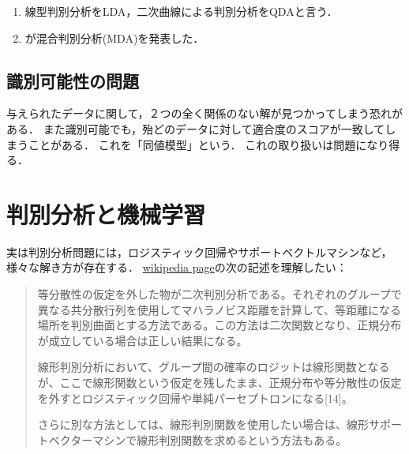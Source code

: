 \documentclass[uplatex,dvipdfmx]{jsreport}
\begin{document}
\begin{history}\mbox{}
    \begin{enumerate}
        \item 線型判別分析をLDA，二次曲線による判別分析をQDAと言う．
        \item \cite{Hastie96} が混合判別分析(MDA)を発表した．
    \end{enumerate}
\end{history}

\subsection{識別可能性の問題}

\begin{tcolorbox}[colframe=ForestGreen, colback=ForestGreen!10!white,breakable,colbacktitle=ForestGreen!40!white,coltitle=black,fonttitle=\bfseries\sffamily,
title=]
    与えられたデータに関して，２つの全く関係のない解が見つかってしまう恐れがある．
    また識別可能でも，殆どのデータに対して適合度のスコアが一致してしまうことがある．
    これを「同値模型」という．
    これの取り扱いは問題になり得る．
\end{tcolorbox}

\section{判別分析と機械学習}

\begin{tcolorbox}[colframe=ForestGreen, colback=ForestGreen!10!white,breakable,colbacktitle=ForestGreen!40!white,coltitle=black,fonttitle=\bfseries\sffamily,
title=]
    実は判別分析問題には，ロジスティック回帰やサポートベクトルマシンなど，様々な解き方が存在する．
    \href{https://ja.wikipedia.org/wiki/%E5%88%A4%E5%88%A5%E5%88%86%E6%9E%90}{wikipedia page}の次の記述を理解したい：
    \begin{quote}
        等分散性の仮定を外した物が二次判別分析である。それぞれのグループで異なる共分散行列を使用してマハラノビス距離を計算して、等距離になる場所を判別曲面とする方法である。この方法は二次関数となり、正規分布が成立している場合は正しい結果になる。

        線形判別分析において、グループ間の確率のロジットは線形関数となるが、ここで線形関数という仮定を残したまま、正規分布や等分散性の仮定を外すとロジスティック回帰や単純パーセプトロンになる[14]。

        さらに別な方法としては、線形判別関数を使用したい場合は、線形サポートベクターマシンで線形判別関数を求めるという方法もある。 
    \end{quote}
\end{tcolorbox}
\end{document}
